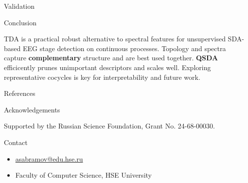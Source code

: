 \documentclass[final]{beamer}
\newlength{\onecolwid}
\begin{document}
\begin{frame}[t]
\begin{columns}[t]
\begin{column}{\onecolwid}
\begin{block}{Validation}
\end{block}

\begin{block}{Conclusion}

TDA is a practical robust alternative to spectral features for unsupervised SDA-based EEG stage detection on continuous processes. Topology and spectra capture \textbf{complementary} structure and are best used together. \textbf{QSDA} efficicently prunes unimportant descriptors and scales well. Exploring representative cocycles is key for interpretability and future work.

\end{block}

\begin{block}{References}


\small{}

\end{block}


\begin{block}{Acknowledgements}

\small{Supported by the Russian Science Foundation, Grant No. 24-68-00030.}

\end{block}


\begin{alertblock}{Contact}

\begin{itemize}
\item \href{mailto:asabramov@edu.hse.ru}{asabramov@edu.hse.ru}
\item Faculty of Computer Science, HSE University
\end{itemize}

\end{alertblock}

\end{column}

\end{columns}

\end{frame}
\end{document}
